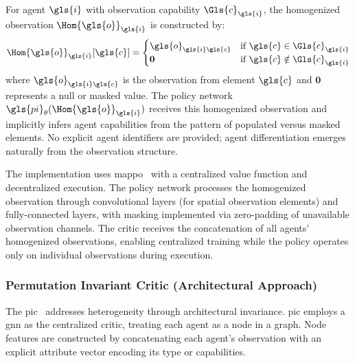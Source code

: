 For agent \(\gls{i}\) with observation capability \(\Gls{c}_{\gls{i}}\), 
the homogenized observation \(\Hom{\gls{o}}_{\gls{i}}\) is constructed by:
\begin{equation*}
    \Hom{\gls{o}}_{\gls{i}}[\gls{c}] =
    \begin{cases}
        \gls{o}_{\gls{i}\gls{c}} & \text{if } \gls{c}\in\Gls{c}_{\gls{i}} \\
        \mathbf{0} & \text{if } \gls{c} \notin\Gls{c}_{\gls{i}}
    \end{cases}
\end{equation*}
where \(\gls{o}_{\gls{i}\gls{c}}\) is the observation from element 
\(\gls{c}\) and \(\mathbf{0}\) represents a null or masked value. 
The policy network \(\gls{pi}_\theta(\Hom{\gls{o}}_{\gls{i}})\)
receives this homogenized observation and implicitly infers agent 
capabilities from the pattern of populated versus masked elements. 
No explicit agent identifiers are provided; agent differentiation emerges 
naturally from the observation structure.

The implementation uses \gls{mappo}~\cite{yu2022} with a centralized value 
function and decentralized execution. The policy network processes the 
homogenized observation through convolutional layers (for spatial observation elements) 
and fully-connected layers, with masking implemented via zero-padding of 
unavailable observation channels. The critic receives the concatenation of all agents' 
homogenized observations, enabling centralized training while the policy 
operates only on individual observations during execution.

\subsubsection{Permutation Invariant Critic (Architectural Approach)}

The \gls{pic}~\cite{liu2020b} addresses heterogeneity through architectural invariance. 
\Gls{pic} employs a \gls{gnn} as the centralized critic, 
treating each agent as a node in a graph. 
Node features are constructed by concatenating each agent's observation 
with an explicit attribute vector encoding its type or capabilities.

